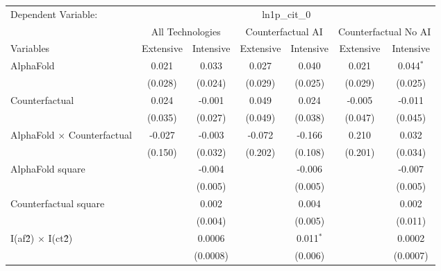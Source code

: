 \begingroup
\centering
\begin{tabular}{lcccccc}
   \tabularnewline \midrule \midrule
   Dependent Variable: & \multicolumn{6}{c}{ln1p\_cit\_0}\\
 & \multicolumn{2}{c}{All Technologies} & \multicolumn{2}{c}{Counterfactual AI} & \multicolumn{2}{c}{Counterfactual No AI} \\
\cmidrule(lr){1-1}\cmidrule(lr){2-3} \cmidrule(lr){4-5} \cmidrule(lr){6-7}
Variables & \multicolumn{1}{c}{Extensive} & \multicolumn{1}{c}{Intensive} & \multicolumn{1}{c}{Extensive} & \multicolumn{1}{c}{Intensive} & \multicolumn{1}{c}{Extensive} & \multicolumn{1}{c}{Intensive} \\
\cmidrule(lr){1-1}\cmidrule(lr){2-2} \cmidrule(lr){3-3} \cmidrule(lr){4-4} \cmidrule(lr){5-5} \cmidrule(lr){6-6} \cmidrule(lr){7-7}
   AlphaFold                          & 0.021   & 0.033    & 0.027   & 0.040       & 0.021   & 0.044$^{*}$\\   
                                      & (0.028) & (0.024)  & (0.029) & (0.025)     & (0.029) & (0.025)\\   
   Counterfactual                     & 0.024   & -0.001   & 0.049   & 0.024       & -0.005  & -0.011\\   
                                      & (0.035) & (0.027)  & (0.049) & (0.038)     & (0.047) & (0.045)\\   
   AlphaFold $\times$ Counterfactual  & -0.027  & -0.003   & -0.072  & -0.166      & 0.210   & 0.032\\   
                                      & (0.150) & (0.032)  & (0.202) & (0.108)     & (0.201) & (0.034)\\   
   AlphaFold square                   &         & -0.004   &         & -0.006      &         & -0.007\\   
                                      &         & (0.005)  &         & (0.005)     &         & (0.005)\\   
   Counterfactual square              &         & 0.002    &         & 0.004       &         & 0.002\\   
                                      &         & (0.004)  &         & (0.005)     &         & (0.011)\\   
   I(af\^2) $\times$ I(ct\^2)         &         & 0.0006   &         & 0.011$^{*}$ &         & 0.0002\\   
                                      &         & (0.0008) &         & (0.006)     &         & (0.0007)\\   

\end{tabular}
